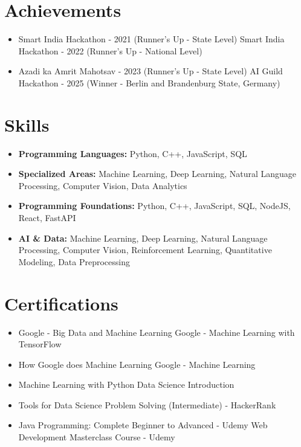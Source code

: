 \documentclass[a4paper,10pt]{article}
\begin{document}
\section*{Achievements}
\begin{itemize}
\item Smart India Hackathon - 2021 (Runner's Up - State Level) \hfill Smart India Hackathon - 2022 (Runner's Up - National Level)
\item Azadi ka Amrit Mahotsav - 2023 (Runner's Up - State Level) \hfill AI Guild Hackathon - 2025 (Winner - Berlin and Brandenburg State, Germany)
\end{itemize}

\section*{Skills}
\begin{itemize}
  \item \textbf{Programming Languages:} Python, C++, JavaScript, SQL
  \item \textbf{Specialized Areas:} Machine Learning, Deep Learning, Natural Language Processing, Computer Vision, Data Analytics
  \item \textbf{Programming Foundations:} Python, C++, JavaScript, SQL, NodeJS, React, FastAPI
  \item \textbf{AI \& Data:} Machine Learning, Deep Learning, Natural Language Processing, Computer Vision, Reinforcement Learning, Quantitative Modeling, Data Preprocessing
\end{itemize}

\section*{Certifications}
\begin{itemize}
\item Google - Big Data and Machine Learning \hfill Google - Machine Learning with TensorFlow
\item How Google does Machine Learning \hfill Google - Machine Learning
\item Machine Learning with Python \hfill Data Science Introduction
\item Tools for Data Science \hfill Problem Solving (Intermediate) - HackerRank
\item Java Programming: Complete Beginner to Advanced - Udemy \hfill Web Development Masterclass Course - Udemy
\end{itemize}
\end{document}
